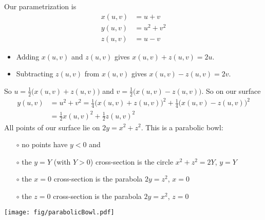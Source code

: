 \begin{solution} 
Our parametrization is
\begin{align*}
x(u,v) &= u+v \\
y(u,v) &= u^2+v^2 \\
z(u,v) &= u-v
\end{align*}
\begin{itemize}
\item
Adding $x(u,v)$ and $z(u,v)$ gives $x(u,v)+z(u,v) = 2u$. 
\item
Subtracting $z(u,v)$ from $x(u,v)$ gives $x(u,v)-z(u,v) = 2v$.
\end{itemize}
So $u=\frac{1}{2}\big(x(u,v)+z(u,v)\big)$ and
        $v=\frac{1}{2}\big(x(u,v)-z(u,v)\big)$. So on our surface
\begin{align*}
y(u,v) &= u^2+v^2 = \frac{1}{4}\big(x(u,v)+z(u,v)\big)^2
                  +\frac{1}{4}\big(x(u,v)-z(u,v)\big)^2 \\
 &= \frac{1}{2} x(u,v)^2 + \frac{1}{2} z(u,v)^2
\end{align*}
All points of our surface lie on $2y= x^2+z^2$. This is a parabolic bowl:
\begin{itemize}\itemsep1pt \parskip0pt  %
\item[$\circ$]
no points have $y<0$ and
\item[$\circ$]
the $y=Y$ (with $Y> 0$) cross-section is the circle
$x^2+z^2=2Y$, $y=Y$
\item[$\circ$]
the $x=0$ cross-section is the parabola $2y=z^2$, $x=0$
\item[$\circ$]
the $z=0$ cross-section is the parabola $2y=x^2$, $z=0$
\end{itemize}

\begin{center}
       \texttt{[image: fig/parabolicBowl.pdf]}
\end{center}

\end{solution}


\subsection*{\Procedural}


